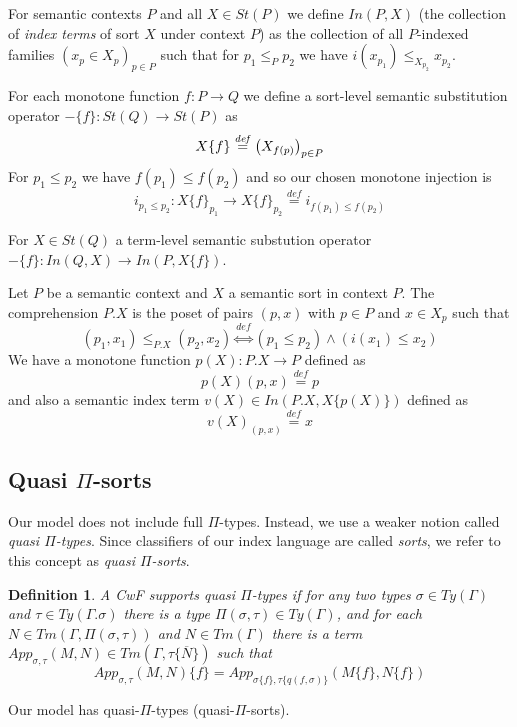 \documentclass{article}
\newtheorem{definition}{Definition}
\newcommand{\defeq}{\overset{\mathit{def}}{=}}
\newcommand{\defequiv}{\overset{\mathit{def}}{\Leftrightarrow}}
\newcommand{\fm}[2]{
\left(
\tiny
#1
\normalsize
\right)_{#2}
}
\begin{document}
For semantic contexts $P$ and all $X \in \mathit{St}(P)$ we define $\mathit{In}(P, X)$ (the collection of \emph{index terms} of sort $X$ under context $P$) as the collection of all $P$-indexed families $(x_p \in X_p)_{p \in P}$ such that for $p_1 \leq_P p_2$ we have $i(x_{p_1}) \leq_{X_{p_2}} x_{p_2}$.

For each monotone function $f : P \to Q$ we define a sort-level semantic substitution operator $- \{ f \} : \mathit{St}(Q) \to \mathit{St}(P)$ as 
$$X \{ f \} \defeq \fm{X_{f(p)}}{p \in P}$$
For $p_1 \leq p_2$ we have $f(p_1) \leq f(p_2)$ and so our chosen monotone injection is 
$$i_{p_1 \leq p_2} : X\{ f \}_{p_1} \to X \{ f \}_{p_2} \defeq i_{f(p_1) \leq f(p_2)}$$

For $X \in \mathit{St}(Q)$ a term-level semantic substution operator $- \{ f \} : \mathit{In}(Q,X) \to \mathit{In}(P, X \{ f \})$.

Let $P$ be a semantic context and $X$ a semantic sort in context $P$. The comprehension $P . X$ is the poset of pairs $(p,x)$ with $p \in P$ and $x \in X_p$ such that 
$$(p_1,x_1) \leq_{P.X} (p_2,x_2) \defequiv (p_1 \leq p_2) \wedge (i(x_1) \leq x_2)$$
We have a monotone function $p(X) : P . X \to P$ defined as 
$$p(X)(p,x) \defeq p$$
and also a semantic index term $v(X) \in \mathit{In}(P.X, X \{ p(X) \})$ defined as
$$v(X)_{(p,x)} \defeq x$$

 
\subsection*{Quasi $\Pi$-sorts}

Our model does not include full $\Pi$-types. Instead, we use a weaker notion called \emph{quasi $\Pi$-types}. Since classifiers of our index language are called \emph{sorts}, we refer to this concept as \emph{quasi $\Pi$-sorts}.

\begin{definition}
A CwF supports \emph{quasi $\Pi$-types} if for any two types $\sigma \in \mathit{Ty}(\Gamma)$ and $\tau \in \mathit{Ty}(\Gamma . \sigma)$ there is a type $\Pi(\sigma,\tau) \in \mathit{Ty}(\Gamma)$, and for each $N \in \mathit{Tm}(\Gamma, \Pi(\sigma,\tau))$ and $N \in \mathit{Tm}(\Gamma)$ there is a term $\mathit{App}_{\sigma, \tau}(M,N) \in \mathit{Tm}(\Gamma, \tau \{ \overline{N} \})$ such that
$$\mathit{App}_{\sigma,\tau}(M,N) \{ f \} = \mathit{App}_{\sigma \{ f \}, \tau \{ q(f, \sigma) \}} (M \{ f \}, N \{ f \})$$
\end{definition}

Our model has quasi-$\Pi$-types (quasi-$\Pi$-sorts).
\end{document}
